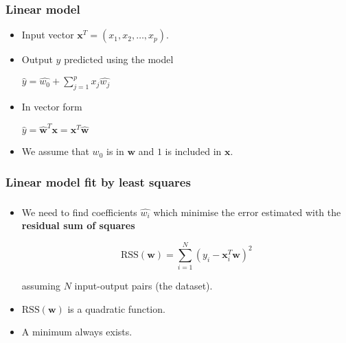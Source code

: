 \documentclass[notes]{beamer}          %
\newcommand{\vect}[1]{\bm{#1}}
\newif\iffull
\begin{document}
\begin{frame}[allowframebreaks]
\frametitle{Linear model}
    \begin{itemize}
        \item Input vector $\vect{x}^T = (x_1, x_2, \ldots, x_p)$.
        \item Output $y$ predicted using the model \\
            \begin{center}
            $\hat{y} = \hat{w_0} + \sum_{j=1}^{p} x_j \hat{w_j}$
            \end{center}
        \iffull
        \item $\hat{w}_i$ $ (0 \leq i \leq p)$ are the parameters of the linear model.
	\framebreak
	\fi
        \item In vector form
            \begin{center}
            $\hat{y} = \hat{\vect{w}}^T\vect{x} = \vect{x}^T \hat{\vect{w}}$
            \end{center}
            \iffull
            using the fact that the scalar (inner) product of two vectors is a commutative operation.
            \fi
        \item  We assume that $w_0$ is in $\vect{w}$ and $1$ is included in $\vect{x}$.
        \iffull
        \item $\hat{y}$ is a scalar, but in general can be a $k$-vector $\hat{\vect{y}}$, in which case $\vect{w}$ becomes a $p \times k$ matrix of coefficients.
        \fi
    \end{itemize}
\end{frame}

\begin{frame}
\frametitle{Linear model fit by least squares}
\frametitle{}
    \begin{itemize}
                \item We need to find coefficients $\hat{w_i}$ which minimise the error estimated with the {\bf residual sum of squares}
                \begin{center}
                    $$\mbox{RSS}(\vect{w}) = \sum_{i = 1}^{N}(y_i - \vect{x}_i^T \vect{w})^2$$
                \end{center}
                 assuming $N$ input-output pairs (the dataset).
        \item $\mbox{RSS}(\vect{w})$ is a quadratic function.
        \item A minimum always exists\iffull though not necessarily a unique one\fi.
    \end{itemize}

\end{frame}
\end{document}

